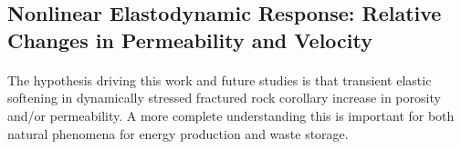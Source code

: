 


\subsection{Nonlinear Elastodynamic Response: Relative Changes in Permeability and Velocity}
\paragraph{}
The hypothesis driving this work and future studies is that transient elastic softening in dynamically stressed fractured rock corollary  increase in porosity and/or permeability. A more complete understanding this is important for both natural phenomena for energy production and waste storage. 

